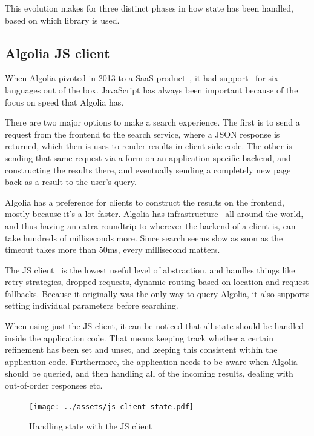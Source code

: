 This evolution makes for three distinct phases in how state has been handled, based on which library is used.

\subsection{Algolia JS client} %
\label{sub:algolia_js_client}

When Algolia pivoted in 2013 to a SaaS product~\cite{algolia-blog-saas}, it had support~\cite{algolia-blog-lauch} for six languages out of the box. JavaScript has always been important because of the focus on speed that Algolia has.

There are two major options to make a search experience. The first is to send a request from the frontend to the search service, where a JSON response is returned, which then is uses to render results in client side code. The other is sending that same request via a form on an application-specific backend, and constructing the results there, and eventually sending a completely new page back as a result to the user's query.

Algolia has a preference for clients to construct the results on the frontend, mostly because it's a lot faster. Algolia has infrastructure~\cite{algolia-infra} all around the world, and thus having an extra roundtrip to wherever the backend of a client is, can take hundreds of milliseconds more. Since search seems slow as soon as the timeout takes more than 50ms, every millisecond matters.

The JS client~\cite{algolia-js-client} is the lowest useful level of abstraction, and handles things like retry strategies, dropped requests, dynamic routing based on location and request fallbacks. Because it originally was the only way to query Algolia, it also supports setting individual parameters before searching.

When using just the JS client, it can be noticed that all state should be handled inside the application code. That means keeping track whether a certain refinement has been set and unset, and keeping this consistent within the application code. Furthermore, the application needs to be aware when Algolia should be queried, and then handling all of the incoming results, dealing with out-of-order responses etc.

\begin{figure}[H]
\label{figure:js-client-state}
  \centering
  \texttt{[image: ../assets/js-client-state.pdf]}
  \caption{Handling state with the JS client}
\end{figure}

